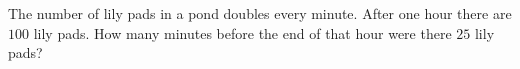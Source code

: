 The number of lily pads in a pond doubles every minute. After one hour there are $100$ lily pads. How many minutes before the end of that hour were there $25$ lily pads?
